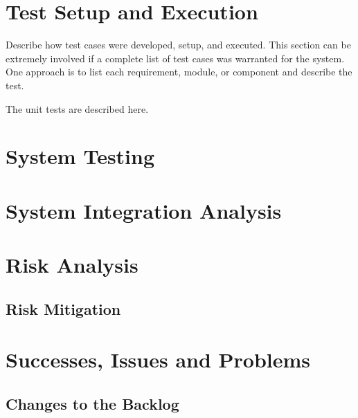 \section{Test Setup and Execution}
Describe how test cases were developed, setup, and executed.  This section can 
be extremely involved if a complete list of test cases was warranted for the system.   One 
approach is to list each requirement, module, or component and describe the test.

The unit tests are described here.

\section{System Testing}

\section{System Integration Analysis}

\section{Risk Analysis}

\subsection{Risk Mitigation}

\section{Successes, Issues and Problems}

\subsection{Changes to the Backlog}

